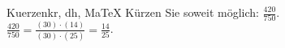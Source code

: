 \begin{MAufgabe}{Kuerzen}{kr, dh, MaTeX}
K\"urzen Sie soweit m\"oglich: $\frac{420}{750}$.\\ 
\ifLsg\MLoesung
\quad $\frac{420}{750}=\frac{(30)\cdot(14)}{(30)\cdot(25)}=\frac{14}{25}$.\else\relax\fi
 \end{MAufgabe}